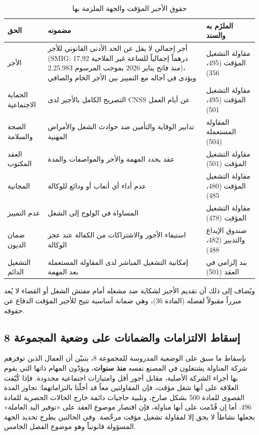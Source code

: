 \begin{table}[htbp]
\centering
\small
\renewcommand{\arraystretch}{1.5}
\begin{tabular}{|p{4.2cm}|p{5.6cm}|p{3.6cm}|}
\hline
\textbf{الحق} & \textbf{مضمونه} & \textbf{الملزَم به والسند} \\
\hline
الأجر & أجر إجمالي لا يقل عن الحد الأدنى القانوني للأجر (\textenglish{SMIG}: \textenglish{17,92} درهماً إجمالياً للساعة غير الفلاحية منذ فاتح يناير \textenglish{2026} بموجب المرسوم \textenglish{2.25.983})، ويؤدى في آجاله مع التمييز بين الأجر الخام والصافي & مقاولة التشغيل المؤقت (\textenglish{495}، \textenglish{356}) \\
\hline
الحماية الاجتماعية & التصريح الكامل بالأجير لدى \textfrench{CNSS} عن أيام العمل & مقاولة التشغيل المؤقت (\textenglish{495}، \textenglish{501}) \\
\hline
الصحة والسلامة & تدابير الوقاية والتأمين ضد حوادث الشغل والأمراض المهنية & المقاولة المستعملة (\textenglish{504}) \\
\hline
العقد المكتوب & عقد يحدد المهمة والأجر والمواصفات والمدة & مقاولة التشغيل المؤقت (\textenglish{501}) \\
\hline
المجانية & عدم أداء أي أتعاب أو ودائع للوكالة & مقاولة التشغيل المؤقت (\textenglish{480}، \textenglish{485}) \\
\hline
عدم التمييز & المساواة في الولوج إلى الشغل & مقاولة التشغيل المؤقت (\textenglish{478}) \\
\hline
ضمان الديون & استيفاء الأجور والاشتراكات من الكفالة عند عجز الوكالة & صندوق الإيداع والتدبير (\textenglish{482}، \textenglish{488}) \\
\hline
التشغيل الدائم & إمكانية التشغيل المباشر لدى المقاولة المستعملة بعد المهمة & بند إلزامي في العقد (\textenglish{501}) \\
\hline
\end{tabular}
\caption{حقوق الأجير المؤقت والجهة الملزمة بها}
\label{tab:droits-interimaire}
\end{table}

ويُضاف إلى ذلك أن تقديم الأجير لشكاية ضد مشغله أمام مفتش الشغل أو القضاء لا يُعد مبرراً مقبولاً لفصله (المادة \textenglish{36})، وهي ضمانة أساسية تتيح للأجير المؤقت الدفاع عن حقوقه.

\subsection{إسقاط الالتزامات والضمانات على وضعية المجموعة 8}
بإسقاط ما سبق على الوضعية المدروسة للمجموعة \textenglish{8}، يتبيّن أن العمال الذين توفرهم شركة المناولة يشتغلون في المصنع نفسه \textbf{منذ سنوات}، ويؤدّون المهام ذاتها التي يقوم بها أجراء الشركة الأصلية، مقابل أجور أقل وامتيازات اجتماعية محدودة. فإذا كُيّفت العلاقة على أنها شغل مؤقت، فإن المقاولتين معاً قد أخلّتا بالتزاماتهما: تجاوز المدة القصوى للمادة \textenglish{500} بشكل صارخ، وتلبية حاجيات دائمة خارج الحالات الحصرية للمادة \textenglish{496}. أما إن قُدّمت على أنها مناولة، فإن اقتصار موضوع العقد على «توفير اليد العاملة» يجعلها نشاطاً لا يحق إلا لمقاولة تشغيل مؤقت مرخّصة. وفي الحالتين يطرح تحديد الجهة المسؤولة قانونياً وهو موضوع الفصل الخامس.

